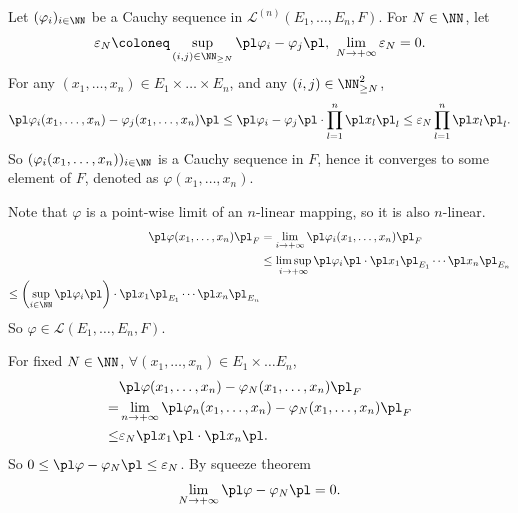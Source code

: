 \begin{proofenv}
    Let $(\varphi_i)_{i\in \NN}$ be a Cauchy sequence in $\mathscr{L}^{(n)}(E_1,\ldots,E_n, F)$. 
    For $N\in \NN$, let
    $$ \varepsilon_N\coloneq \sup_{(i,j)\in \NN_{\ge N}} \pl \varphi_i-\varphi_j \pl,\ \lim_{N\rightarrow +\infty}\varepsilon_N=0.$$
    For any $(x_1,\ldots,x_n)\in E_1\times\dots\times E_n$, and any $(i,j)\in\NN_{\ge N}^2$,
    $$ \pl \varphi_i(x_1,\ldots,x_n)-\varphi_j(x_1,\ldots,x_n)\pl \le \pl \varphi_i-\varphi_j\pl\cdot\prod_{l=1}^{n}\pl x_l\pl_l\le \varepsilon_N\prod_{l=1}^{n}\pl x_l\pl_l.$$
    So $(\varphi_i(x_1,\ldots,x_n))_{i\in \NN}$ is a Cauchy sequence in $F$, hence it converges to some element of $F$, denoted as $\varphi(x_1,\ldots,x_n)$.

    \quad Note that $\varphi$ is a point-wise limit of an $n$-linear mapping, so it is also $n$-linear. 
    \begin{align*}
        \pl \varphi(x_1,\ldots,x_n)\pl_F&=\lim_{i\rightarrow +\infty}\pl \varphi_i(x_1,\ldots,x_n)\pl_F\\
        &\le \limsup_{i\rightarrow +\infty} \pl \varphi_i\pl \cdot\pl x_1\pl_{E_1}\cdots \pl x_n\pl_{E_n}\\
        \le \left(\sup_{i\in \NN}\pl \varphi_i\pl\right)\cdot\pl x_1\pl_{E_1}\cdots \pl x_n \pl_{E_n}
    \end{align*}
    So $\varphi\in \mathscr{L}(E_1,\ldots,E_n, F)$.

    \quad For fixed $N\in \NN$, $\forall (x_1,\ldots,x_n)\in E_1\times \dots E_n$,
    \begin{align*}
        &\pl \varphi(x_1,\ldots,x_n)-\varphi_N(x_1,\ldots,x_n)\pl_F\\
        =& \lim_{n\rightarrow +\infty}\pl \varphi_n(x_1,\ldots,x_n)-\varphi_N(x_1,\ldots,x_n)\pl_F\\
        \le & \varepsilon_N \pl x_1 \pl \cdot\pl x_n\pl.
    \end{align*}
    So $0\le \pl \varphi-\varphi_N\pl\le \varepsilon_N$. By squeeze theorem
    $$ \lim_{N\rightarrow +\infty}\pl \varphi-\varphi_N\pl=0.$$
\end{proofenv}


\newpage
